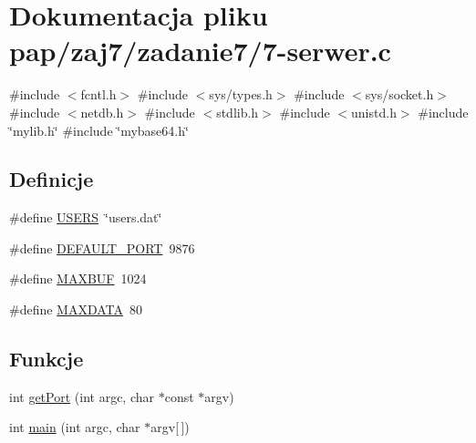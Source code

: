 \hypertarget{7-serwer_8c}{}\section{Dokumentacja pliku pap/zaj7/zadanie7/7-\/serwer.c}
\label{7-serwer_8c}
{\ttfamily \#include $<$fcntl.\+h$>$}\newline
{\ttfamily \#include $<$sys/types.\+h$>$}\newline
{\ttfamily \#include $<$sys/socket.\+h$>$}\newline
{\ttfamily \#include $<$netdb.\+h$>$}\newline
{\ttfamily \#include $<$stdlib.\+h$>$}\newline
{\ttfamily \#include $<$unistd.\+h$>$}\newline
{\ttfamily \#include \char`\"{}mylib.\+h\char`\"{}}\newline
{\ttfamily \#include \char`\"{}mybase64.\+h\char`\"{}}\newline
\subsection*{Definicje}
\begin{DoxyCompactItemize}
\item 
\#define \mbox{\hyperlink{7-serwer_8c_a322789c10f93ef5e09a1d5f17aabf0e3}{U\+S\+E\+RS}}~\char`\"{}users.\+dat\char`\"{}
\item 
\#define \mbox{\hyperlink{7-serwer_8c_a16b710f592bf8f7900666392adc444dc}{D\+E\+F\+A\+U\+L\+T\+\_\+\+P\+O\+RT}}~9876
\item 
\#define \mbox{\hyperlink{7-serwer_8c_ad7871643c05865c80f5d8050aead2b57}{M\+A\+X\+B\+UF}}~1024
\item 
\#define \mbox{\hyperlink{7-serwer_8c_ae7e715c270481406658bbd2bafa2897f}{M\+A\+X\+D\+A\+TA}}~80
\end{DoxyCompactItemize}
\subsection*{Funkcje}
\begin{DoxyCompactItemize}
\item 
int \mbox{\hyperlink{7-serwer_8c_a3eb60b93b6901c2acd5eb7df758d81b0}{get\+Port}} (int argc, char $\ast$const $\ast$argv)
\item 
int \mbox{\hyperlink{7-serwer_8c_a0ddf1224851353fc92bfbff6f499fa97}{main}} (int argc, char $\ast$argv\mbox{[}$\,$\mbox{]})
\end{DoxyCompactItemize}


